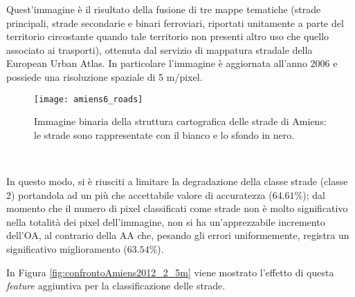 Quest'immagine è il risultato della fusione di tre mappe tematiche
(strade principali, strade secondarie e binari ferroviari, riportati
unitamente a parte del territorio circostante quando tale territorio
non presenti altro uso che quello associato ai trasporti), ottenuta
dal servizio di mappatura stradale della European Urban Atlas. In
particolare l'immagine è aggiornata all'anno $2006$ e possiede una
risoluzione spaziale di 5 m/pixel.

\begin{figure}[!ht]

\center

\texttt{[image: amiens6\_roads]}

\caption{Immagine binaria della struttura cartografica delle strade di
Amiens: le strade sono rappresentate con il bianco e lo sfondo in
nero.}

\label{fig:immagine_roads}

\end{figure}

\


In questo modo, si è riusciti a limitare la degradazione della classe
strade (classe 2) portandola ad un più che accettabile valore di
accuratezza ($64.61\%$); dal momento che il numero di pixel
classificati come strade non è molto significativo nella totalità dei
pixel dell'immagine, non si ha un'apprezzabile incremento dell'OA,
al
contrario della AA che, pesando gli errori uniformemente, registra un
significativo miglioramento ($63.54\%$).

In Figura \ref{fig:confrontoAmiens2012_2_5m} viene mostrato l'effetto
di questa \emph{feature} aggiuntiva per la classificazione delle
strade.


